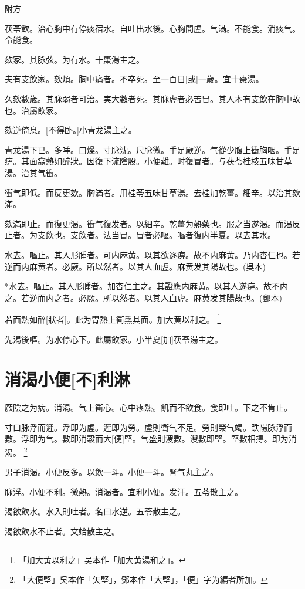 \documentclass[12pt,twoside,UTF8,b5paper]{ctexbook}
\begin{document}
附方

茯苓飲。治心胸中有停痰宿水。自吐出水後。心胸間虗。气滿。不能食。消痰气。令能食。

欬家。其脉弦。为有水。十棗湯主之。

夫有支飲家。欬煩。胸中痛者。不卒死。至一百日[或]一歲。宜十棗湯。

久欬數歲。其脉弱者可治。実大數者死。其脉虗者必苦冒。其人本有支飲在胸中故也。治屬飲家。

欬逆倚息。[不得卧。]小青龙湯主之。

青龙湯下已。多唾。口燥。寸脉沈。尺脉微。手足厥逆。气從少腹上衝胸咽。手足痹。其面翕熱如醉狀。因復下流陰股。小便難。时復冒者。与茯苓桂枝五味甘草湯。治其气衝。

衝气即低。而反更欬。胸滿者。用桂苓五味甘草湯。去桂加乾薑。細辛。以治其欬滿。

欬滿即止。而復更渴。衝气復发者。以細辛。乾薑为熱藥也。服之当遂渴。而渴反止者。为支飲也。支飲者。法当冒。冒者必嘔。嘔者復内半夏。以去其水。

水去。嘔止。其人形腫者。可内麻黄。以其欲逐痹。故不内麻黄。乃内杏仁也。若逆而内麻黄者。必厥。所以然者。以其人血虗。麻黄发其陽故也。(吳本)

*水去。嘔止。其人形腫者。加杏仁主之。其證應内麻黄。以其人遂痹。故不内之。若逆而内之者。必厥。所以然者。以其人血虗。麻黄发其陽故也。(鄧本)

若面熱如醉[狀者]。此为胃熱上衝熏其面。加大黄以利之。
	\footnote{「加大黄以利之」吴本作「加大黄湯和之」。}

先渴後嘔。为水停心下。此屬飲家。小半夏[加]茯苓湯主之。

\chapter{消渴小便[不]利淋}

厥陰之为病。消渴。气上衝心。心中疼熱。飢而不欲食。食即吐。下之不肯止。

寸口脉浮而遲。浮即为虗。遲即为勞。虗則衛气不足。勞則榮气竭。跌陽脉浮而數。浮即为气。數即消穀而大[便]堅。气盛則溲數。溲數即堅。堅數相摶。即为消渴。
	\footnote{「大便堅」吳本作「矢堅」，鄧本作「大堅」，「便」字为編者所加。}

男子消渴。小便反多。以飲一斗。小便一斗。腎气丸主之。

脉浮。小便不利。微熱。消渴者。宜利小便。发汗。五苓散主之。

渴欲飲水。水入則吐者。名曰水逆。五苓散主之。

渴欲飲水不止者。文蛤散主之。
\end{document}

